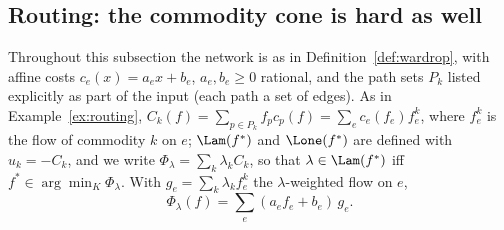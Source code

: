 
\subsection*{Routing: the commodity cone is hard as well}

Throughout this subsection the network is as in Definition~\ref{def:wardrop}, with affine costs $c_e(x)=a_ex+b_e$, $a_e,b_e\ge0$ rational, and the path sets $P_k$ listed explicitly as part of the input (each path a set of edges). As in Example~\ref{ex:routing}, $C_k(f)=\sum_{p\in P_k}f_pc_p(f)=\sum_ec_e(f_e)f^k_e$, where $f^k_e$ is the flow of commodity $k$ on $e$; $\Lam(f^*)$ and $\Lone(f^*)$ are defined with $u_k=-C_k$, and we write $\Phi_\lambda=\sum_k\lambda_kC_k$, so that $\lambda\in\Lam(f^*)$ iff $f^*\in\arg\min_K\Phi_\lambda$. With $g_e=\sum_k\lambda_kf^k_e$ the $\lambda$-weighted flow on $e$,
\begin{equation}\label{eq:phiroute}
\Phi_\lambda(f)=\sum_e(a_ef_e+b_e)\,g_e .
\end{equation}

